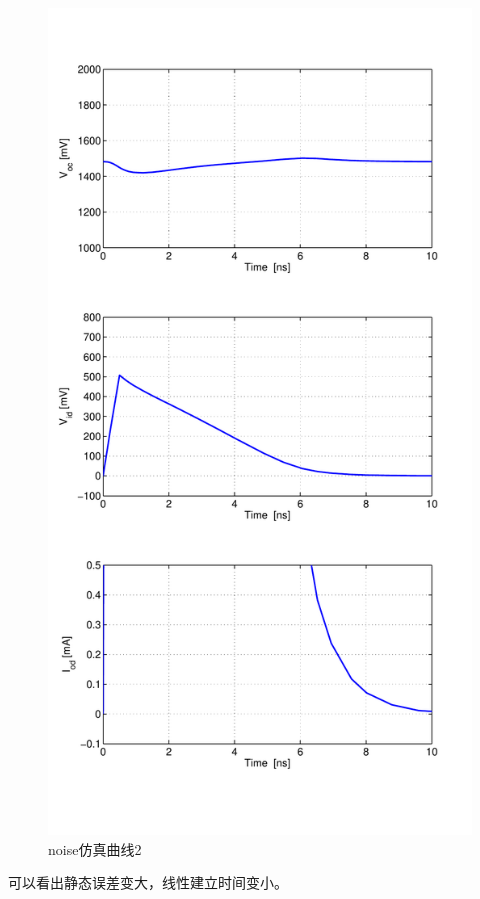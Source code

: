 \documentclass[a4paper]{article}
\begin{document}
\begin{figure}[htb]
    \begin{center}
        \includegraphics[width=\textwidth]{fast/tran2.pdf}
    \end{center}
    \caption{noise仿真曲线2}
    \label{fasttran2}
\end{figure}
可以看出静态误差变大，线性建立时间变小。
\end{document}
